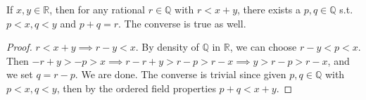     \begin{lemma}
      If $x, y \in \mathbb{R}$, then for any rational $r \in \mathbb{Q}$ with $r < x + y$, there exists a $p, q \in \mathbb{Q}$ s.t. $p < x, q < y$ and $p + q = r$. The converse is true as well. 
    \end{lemma}
    \begin{proof}
      $r < x + y \implies r - y < x$. By density of $\mathbb{Q}$ in $\mathbb{R}$, we can choose $r - y < p < x$. Then $-r + y > -p > x \implies r - r + y > r - p > r - x \implies y > r - p > r - x$, and we set $q = r - p$. We are done. The converse is trivial since given $p, q \in \mathbb{Q}$ with $p < x, q < y$, then by the ordered field properties $p + q < x + y$. 
    \end{proof}

